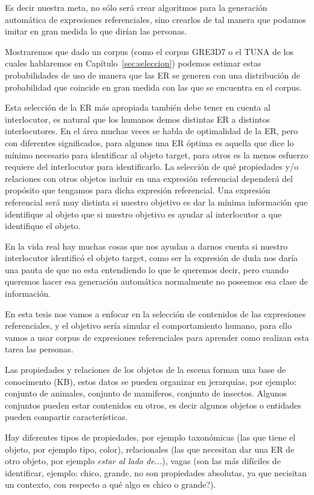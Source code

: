 Es decir nuestra meta, no s\'olo ser\'a crear algoritmos para la generaci\'on autom\'atica de expresiones referenciales, sino crearlos de tal manera que podamos imitar en gran medida lo que dir\'ian las personas.

Mostraremos que dado un corpus (como el corpus GRE3D7 o el TUNA de los cuales hablaremos en Cap\'itulo~\ref{sec:seleccion}) podemos estimar estas probabilidades de uso de manera que las ER se generen con una distribuci\'on de probabilidad que coincide en gran medida con las que se encuentra en el corpus.

Esta selecci\'on de la ER m\'as apropiada tambi\'en debe tener en cuenta al interlocutor, es natural que los humanos demos distintas ER a distintos interlocutores. En el \'area muchas veces se habla de optimalidad de la ER, pero con diferentes significados, para algunos una ER \'optima es aquella que dice lo m\'inimo necesario para identificar al objeto target, para otros es la menos esfuerzo requiere del interlocutor para identificarlo.
La selecci\'on de qu\'e propiedades y/o relaciones con otros objetos incluir en una expresi\'on referencial depender\'a del prop\'osito que tengamos para dicha expresi\'on referencial. Una expresi\'on referencial ser\'a muy distinta si nuestro objetivo es dar la m\'inima informaci\'on que identifique al objeto que si nuestro objetivo es ayudar al interlocutor a que identifique el objeto.

En la vida real hay muchas cosas que nos ayudan a darnos cuenta si nuestro interlocutor identific\'o el objeto target, como ser la expresi\'on de duda nos dar\'ia una pauta de que no esta entendiendo lo que le queremos decir, pero cuando queremos hacer esa generaci\'on autom\'atica normalmente no poseemos esa clase de informaci\'on.

En esta tesis nos vamos a enfocar en la selecci\'on de contenidos de las expresiones referenciales, y el objetivo ser\'ia simular el comportamiento humano, para ello vamos a usar corpus de expresiones referenciales para aprender como realizan esta tarea las personas.
 
Las propiedades y relaciones de los objetos de la escena forman una base de conocimento (KB), estos datos se pueden organizar en jerarqu\'ias, por ejemplo: conjunto de animales, conjunto de mamiferos, conjunto de insectos. Algunos conjuntos pueden estar contenidos en otros, es decir algunos objetos o entidades pueden compartir caracter\'isticas.

Hay diferentes tipos de propiedades, por ejemplo taxon\'omicas (las que tiene el objeto, por ejemplo tipo, color), relacionales (las que necesitan dar una ER de otro objeto, por ejemplo {\it estar al lado de...}), vagas (son las m\'as dif\'iciles de identificar, ejemplo: chico, grande, no son propiedades absolutas, ya que necisitan un contexto, con respecto a qu\'e algo es chico o grande?).

